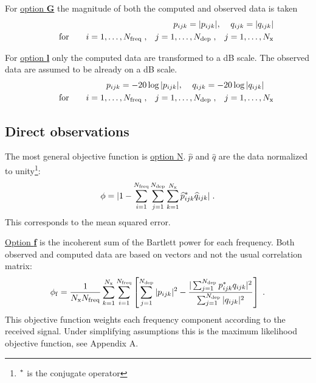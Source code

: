 \documentclass{saclantc}
\begin{document}
For \underline{option {\bf G}} the magnitude of both the computed and
observed data is taken
\begin{eqnarray}
p_{ijk}= |p_{ijk} | , \;\;\;\;
q_{ijk}= |q_{ijk} | \\
\qquad \mbox{for}\qquad  
i=1,\ldots , N_{\rm freq} \; , \;\;\; j=1,\ldots ,N_{\rm dep} \; , \;\;\;
j=1,\ldots ,N_{\rm x}
\end{eqnarray}

For \underline{option {\bf l}} only the computed 
 data are transformed to a dB scale. The observed data are assumed
to be already on a dB scale.
\begin{eqnarray}
p_{ijk}= -20 \log |p_{ijk} | ,\;\;\;\;
q_{ijk}= -20 \log |q_{ijk} |\;\;\;\; \\
\qquad \mbox{for}\qquad  
i=1,\ldots , N_{\rm freq} \; , \;\;\; j=1,\ldots ,N_{\rm dep} \; , \;\;\;
j=1,\ldots ,N_{\rm x}
\end{eqnarray}

\subsection{Direct observations}

The most general objective function is \underline{option N}.
$\widehat{p}$ and $\widehat{q}$ are the data normalized to 
unity\footnote{$^{\rm *} $ is the conjugate operator}:
\begin{equation}
\phi= |1- \sum^{N _{\rm freq}}_{i=1} \sum^{N _{\rm dep}}_{j=1} \sum^{N_{ \rm x}}_{k=1}
\widehat{p}_{ijk}^{\rm *} \widehat{q}_{ijk}|\; .
\label{eq:obj1}
\end{equation}
This corresponds to the mean squared error.


\underline{Option {\bf f}}
is the incoherent sum of the Bartlett power for each frequency. 
Both observed and computed data  are based on 
vectors and not  the usual correlation matrix: 
\begin{equation}
 \phi_{\rm f}= \frac{1}{N_{\rm x}{N _{\rm freq}}}
  \sum^{N_{\rm x}}_{k=1} \sum^{N _{\rm freq}}_{i=1} \left[
   \sum^{N _{\rm dep}}_{j=1} |{p}_{ijk}|^2 -
{{|\sum^{N _{\rm dep}}_{j=1} {p}_{ijk}^{\rm *} {q}_{ijk}|^2}
      \over {
             \sum^{N _{\rm dep}}_{j=1} |{q}_{ijk}|^2}}\right]
  \; .
\label{eq:objf}
\end{equation}
This objective function weights each frequency component according to
the received signal. Under simplifying assumptions this is the maximum
likelihood objective function, see Appendix A.
\end{document}

